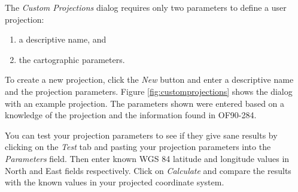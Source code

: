 The \textit{Custom Projections} dialog requires only two parameters to define a user
projection: 
\begin{enumerate}
\item a descriptive name, and
\item the cartographic parameters. 
\end{enumerate}
To create a new projection, click the \textit{New} button and enter a descriptive
name and the projection parameters. Figure \ref{fig:customprojections} shows
the dialog with an example projection. The parameters shown were entered based
on a knowledge of the projection and the information found in OF90-284.

You can test your projection parameters to see if they give sane results by
clicking on the \textit{Test} tab and pasting your projection parameters into
the \textit{Parameters} field. Then enter known WGS 84 latitude and longitude
values in North and East fields respectively. Click on \textit{Calculate} and
compare the results with the known values in your projected coordinate
system. 
